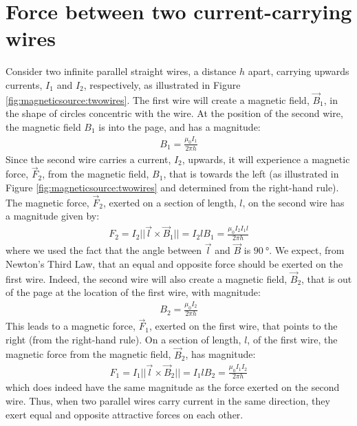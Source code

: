 \section{Force between two current-carrying wires}
Consider two infinite parallel straight wires, a distance $h$ apart, carrying upwards currents, $I_1$ and $I_2$, respectively, as illustrated in Figure \ref{fig:magneticsource:twowires}.
The first wire will create a magnetic field, $\vec B_1$, in the shape of circles concentric with the wire. At the position of the second wire, the magnetic field $B_1$ is into the page, and has a magnitude:
\begin{align*}
B_1 = \frac{\mu_0 I_1}{2\pi h}
\end{align*} 
Since the second wire carries a current, $I_2$, upwards, it will experience a magnetic force, $\vec F_2$, from the magnetic field, $B_1$, that is towards the left (as illustrated in Figure \ref{fig:magneticsource:twowires} and determined from the right-hand rule). The magnetic force, $\vec F_2$, exerted on a section of length, $l$, on the second wire has a magnitude given by:
\begin{align*}
F_2 = I_2 ||\vec l \times \vec B_1||=I_2 l B_1 =\frac{\mu_0 I_2 I_1 l}{2\pi h}
\end{align*}
where we used the fact that the angle between $\vec l$ and $\vec B$ is $\SI{90}{\degree}$. We expect, from Newton's Third Law, that an equal and opposite force should be exerted on the first wire. Indeed, the second wire will also create a magnetic field, $\vec B_2$, that is out of the page at the location of the first wire, with magnitude:
\begin{align*}
B_2 = \frac{\mu_0 I_2}{2\pi h}
\end{align*}
This leads to a magnetic force, $\vec F_1$, exerted on the first wire, that points to the right (from the right-hand rule). On a section of length, $l$, of the first wire, the magnetic force from the magnetic field, $\vec B_2$, has magnitude:
\begin{align*}
F_1 = I_1 ||\vec l \times \vec B_2||=I_1 l B_2 =\frac{\mu_0 I_1 I_2}{2\pi h}
\end{align*}
which does indeed have the same magnitude as the force exerted on the second wire. Thus, when two parallel wires carry current in the same direction, they exert equal and opposite attractive forces on each other. 

